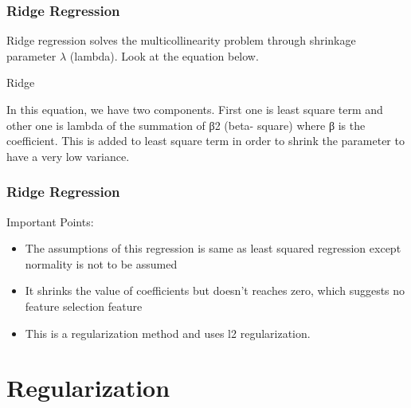 \documentclass{beamer}
\begin{document}
\begin{frame}
	\frametitle{Ridge Regression}
	\large
	Ridge regression solves the multicollinearity problem through shrinkage parameter $\lambda$ (lambda). Look at the equation below.
	
	Ridge
	
	In this equation, we have two components. First one is least square term and other one is lambda of the summation of β2 (beta- square) where β is the coefficient. This is added to least square term in order to shrink the parameter to have a very low variance.
\end{frame}
\begin{frame}
	\frametitle{Ridge Regression}
	\large	
	Important Points:
	
	\begin{itemize}
\item 	The assumptions of this regression is same as least squared regression except normality is not to be assumed
\item 	It shrinks the value of coefficients but doesn’t reaches zero, which suggests no feature selection feature
\item  	This is a regularization method and uses l2 regularization.
	\end{itemize}

	
\end{frame}
\section{Regularization}
\end{document}
